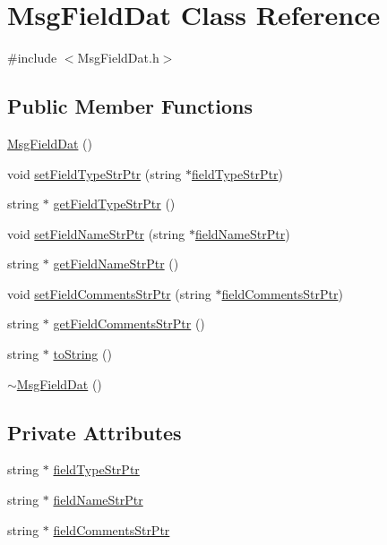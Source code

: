 \hypertarget{class_msg_field_dat}{\section{Msg\-Field\-Dat Class Reference}
\label{class_msg_field_dat}
}


{\ttfamily \#include $<$Msg\-Field\-Dat.\-h$>$}

\subsection*{Public Member Functions}
\begin{DoxyCompactItemize}
\item 
\hyperlink{class_msg_field_dat_a7b1ec6d1c6eaa385aa8c65178d9704df}{Msg\-Field\-Dat} ()
\item 
void \hyperlink{class_msg_field_dat_a70c90ec00642b5dc2d54f64b1d343d8e}{set\-Field\-Type\-Str\-Ptr} (string $\ast$\hyperlink{class_msg_field_dat_a14fd69763d364248df1f4f33ea5a3de6}{field\-Type\-Str\-Ptr})
\item 
string $\ast$ \hyperlink{class_msg_field_dat_a49f108213f7722e4a1cd686d897d9bf9}{get\-Field\-Type\-Str\-Ptr} ()
\item 
void \hyperlink{class_msg_field_dat_a7fc7f4560ffa4ecdbeb3544e259f660e}{set\-Field\-Name\-Str\-Ptr} (string $\ast$\hyperlink{class_msg_field_dat_a55d98818f189cf1a3e00089b0fcf2128}{field\-Name\-Str\-Ptr})
\item 
string $\ast$ \hyperlink{class_msg_field_dat_ada59330561ff5ea5f2911288a66782e3}{get\-Field\-Name\-Str\-Ptr} ()
\item 
void \hyperlink{class_msg_field_dat_afb6e3446abe0d19923543f824817dd26}{set\-Field\-Comments\-Str\-Ptr} (string $\ast$\hyperlink{class_msg_field_dat_a419eff9499b3441425fc0a8e04a12c81}{field\-Comments\-Str\-Ptr})
\item 
string $\ast$ \hyperlink{class_msg_field_dat_a1d89d030dadd00b40cab9d11b8309980}{get\-Field\-Comments\-Str\-Ptr} ()
\item 
string $\ast$ \hyperlink{class_msg_field_dat_a722d2357267860a38ca226502eb0c61e}{to\-String} ()
\item 
\hyperlink{class_msg_field_dat_aceca7989d37af550f5ad638b7cb2ca13}{$\sim$\-Msg\-Field\-Dat} ()
\end{DoxyCompactItemize}
\subsection*{Private Attributes}
\begin{DoxyCompactItemize}
\item 
string $\ast$ \hyperlink{class_msg_field_dat_a14fd69763d364248df1f4f33ea5a3de6}{field\-Type\-Str\-Ptr}
\item 
string $\ast$ \hyperlink{class_msg_field_dat_a55d98818f189cf1a3e00089b0fcf2128}{field\-Name\-Str\-Ptr}
\item 
string $\ast$ \hyperlink{class_msg_field_dat_a419eff9499b3441425fc0a8e04a12c81}{field\-Comments\-Str\-Ptr}
\end{DoxyCompactItemize}


